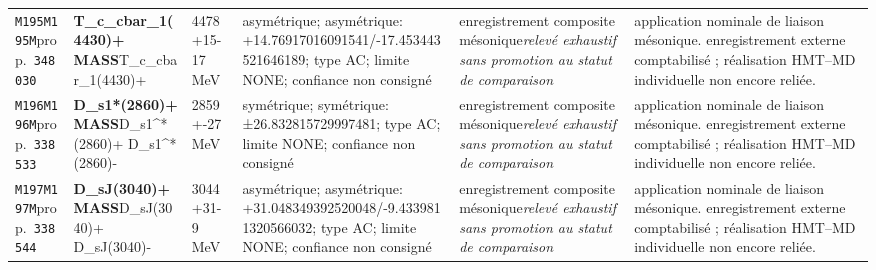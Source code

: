 \begin{landscape}
\begin{longtable}{L{1.85cm}L{4.45cm}L{2.35cm}L{4.05cm}L{3.35cm}L{7.15cm}}
\texttt{M195}\newline \texttt{M195M}\newline prop.\ \texttt{348030} & \textbf{T\_\allowbreak{}c\_\allowbreak{}cbar\_\allowbreak{}1(4430)+ MASS}\newline T\_\allowbreak{}c\_\allowbreak{}cbar\_\allowbreak{}1(4430)+ & 4478+15-17\,MeV & asymétrique; asymétrique: +14.76917016091541/-17.453443521646189; type AC; limite NONE; confiance non consigné & enregistrement composite mésonique\newline \emph{relevé exhaustif sans promotion au statut de comparaison} & application nominale de liaison mésonique. enregistrement externe comptabilisé ; réalisation HMT--MD individuelle non encore reliée. \\
\texttt{M196}\newline \texttt{M196M}\newline prop.\ \texttt{338533} & \textbf{D\_\allowbreak{}s1*(2860)+ MASS}\newline D\_\allowbreak{}s1\textasciicircum{}*(2860)+ \textbar{}\allowbreak{} D\_\allowbreak{}s1\textasciicircum{}*(2860)- & 2859+-27\,MeV & symétrique; symétrique: ±26.832815729997481; type AC; limite NONE; confiance non consigné & enregistrement composite mésonique\newline \emph{relevé exhaustif sans promotion au statut de comparaison} & application nominale de liaison mésonique. enregistrement externe comptabilisé ; réalisation HMT--MD individuelle non encore reliée. \\
\texttt{M197}\newline \texttt{M197M}\newline prop.\ \texttt{338544} & \textbf{D\_\allowbreak{}sJ(3040)+ MASS}\newline D\_\allowbreak{}sJ(3040)+ \textbar{}\allowbreak{} D\_\allowbreak{}sJ(3040)- & 3044+31-9\,MeV & asymétrique; asymétrique: +31.048349392520048/-9.4339811320566032; type AC; limite NONE; confiance non consigné & enregistrement composite mésonique\newline \emph{relevé exhaustif sans promotion au statut de comparaison} & application nominale de liaison mésonique. enregistrement externe comptabilisé ; réalisation HMT--MD individuelle non encore reliée. \\

\end{longtable}
\end{landscape}

